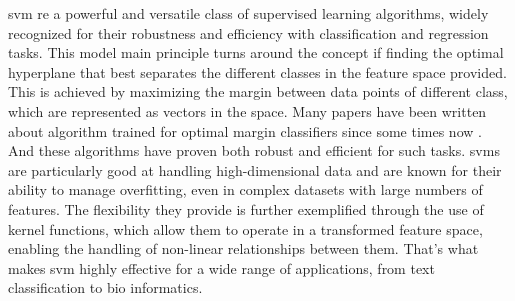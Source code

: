 \documentclass[../../../main.tex]{subfiles}
\begin{document}
\acrfull{svm} re a powerful and versatile class of supervised learning algorithms, widely recognized for their robustness and efficiency with classification and regression tasks.
This model main principle turns around the concept if finding the optimal hyperplane that best separates the different classes in the feature space provided.
This is achieved by maximizing the margin between data points of different class, which are represented as vectors in the space. 
Many papers have been written about algorithm trained for optimal margin classifiers since some times now \cite{boser_training_1992}. And these algorithms have proven both robust and efficient for such tasks.  
\acrshort{svm}s are particularly good at handling high-dimensional data and are known for their ability to manage overfitting, even in complex datasets with large numbers of features.
The flexibility they provide is further exemplified through the use of kernel functions, which allow them to operate in a transformed feature space, enabling the handling of non-linear relationships between them. That's what makes \acrshort{svm} highly effective for a wide range of applications, from text classification to bio informatics. 
\end{document}

